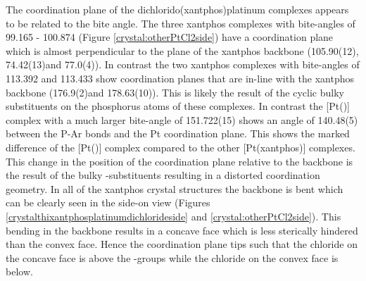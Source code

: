 The coordination plane of the dichlorido(xantphos)platinum complexes appears to be related to the bite angle.  The three xantphos complexes with bite-angles of 99.165 - 100.874\degrees{} (Figure \ref{crystal:otherPtCl2side}) have a coordination plane which is almost perpendicular to the plane of the xantphos backbone (105.90(12)\degrees, 74.42(13)\degrees and 77.0(4)\degrees).  In contrast the two xantphos complexes with bite-angles of 113.392 and 113.433\degrees{} show coordination planes that are in-line with the xantphos backbone (176.9(2)\degrees and 178.63(10)\degrees).  This is likely the result of the cyclic bulky substituents on the phosphorus atoms of these complexes.  In contrast the [Pt(\tButhixantphos)] complex with a much larger bite-angle of 151.722(15)\degrees{} shows an angle of 140.48(5)\degrees{} between the P-Ar bonds and the Pt coordination plane.  This shows the marked difference of the [Pt(\tButhixantphos)] complex compared to the other [Pt(xantphos)] complexes.  This change in the position of the coordination plane relative to the backbone is the result of the bulky \tBu-substituents resulting in a distorted \trans{} coordination geometry.  In all of the xantphos crystal structures the backbone is bent which can be clearly seen in the side-on view (Figures \ref{crystalthixantphosplatinumdichlorideside} and \ref{crystal:otherPtCl2side}).  This bending in the backbone results in a concave face which is less sterically hindered than the convex face.  Hence the coordination plane tips such that the chloride on the concave face is above the \tBu-groups while the chloride on the convex face is below.  

